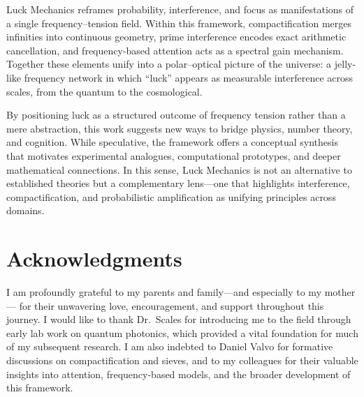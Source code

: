 \documentclass[12pt]{article}
\theoremstyle{plain}
\theoremstyle{definition}
\begin{document}
Luck Mechanics reframes probability, interference, and focus as manifestations 
of a single frequency–tension field. Within this framework, compactification 
merges infinities into continuous geometry, prime interference encodes exact 
arithmetic cancellation, and frequency-based attention acts as a spectral gain 
mechanism. Together these elements unify into a polar–optical picture of the 
universe: a jelly-like frequency network in which ``luck'' appears as measurable 
interference across scales, from the quantum to the cosmological.

By positioning luck as a structured outcome of frequency tension rather than a 
mere abstraction, this work suggests new ways to bridge physics, number theory, 
and cognition. While speculative, the framework offers a conceptual synthesis 
that motivates experimental analogues, computational prototypes, and deeper 
mathematical connections. In this sense, Luck Mechanics is not an alternative to 
established theories but a complementary lens—one that highlights interference, 
compactification, and probabilistic amplification as unifying principles across 
domains.

\section*{Acknowledgments}
I am profoundly grateful to my parents and family—and especially to my mother—
for their unwavering love, encouragement, and support throughout this journey.  
I would like to thank Dr.~Scales for introducing me to the field through early 
lab work on quantum photonics, which provided a vital foundation for much of my 
subsequent research.  
I am also indebted to Daniel Valvo for formative discussions on compactification 
and sieves, and to my colleagues for their valuable insights into attention, 
frequency-based models, and the broader development of this framework.



\end{document}
